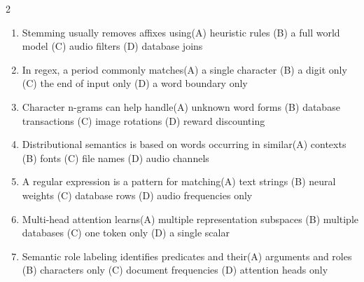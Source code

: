 \documentclass[a4paper]{article}
\begin{document}
\begin{multicols*}{2}
\begin{enumerate}[resume]
\item Stemming usually removes affixes using\newline\hspace*{0.6em}(A) heuristic rules \quad (B) a full world model \newline\hspace*{0.6em}(C) audio filters \quad (D) database joins
\item In regex, a period commonly matches\newline\hspace*{0.6em}(A) a single character \quad (B) a digit only \newline\hspace*{0.6em}(C) the end of input only \quad (D) a word boundary only
\item Character n-grams can help handle\newline\hspace*{0.6em}(A) unknown word forms \quad (B) database transactions \newline\hspace*{0.6em}(C) image rotations \quad (D) reward discounting
\item Distributional semantics is based on words occurring in similar\newline\hspace*{0.6em}(A) contexts \quad (B) fonts \newline\hspace*{0.6em}(C) file names \quad (D) audio channels
\item A regular expression is a pattern for matching\newline\hspace*{0.6em}(A) text strings \quad (B) neural weights \newline\hspace*{0.6em}(C) database rows \quad (D) audio frequencies only
\item Multi-head attention learns\newline\hspace*{0.6em}(A) multiple representation subspaces \quad (B) multiple databases \newline\hspace*{0.6em}(C) one token only \quad (D) a single scalar
\item Semantic role labeling identifies predicates and their\newline\hspace*{0.6em}(A) arguments and roles \quad (B) characters only \newline\hspace*{0.6em}(C) document frequencies \quad (D) attention heads only

\end{enumerate}
\end{multicols*}
\end{document}
